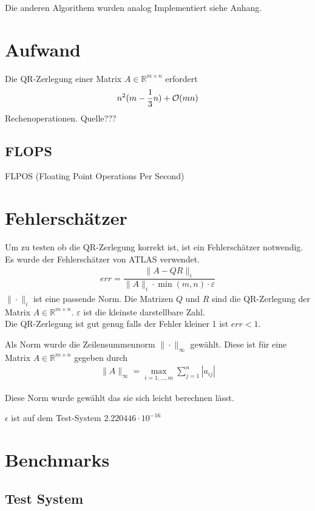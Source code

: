 Die anderen Algorithem wurden analog Implementiert siehe Anhang.


\section{Aufwand}

Die QR-Zerlegung einer Matrix $A \in \mathbb{R}^{m \times n}$  erfordert
\begin{align*}
	n^2(m-\frac{1}{3} n) + {\cal O}(mn)
\end{align*}
Rechenoperationen. Quelle???

\subsection{FLOPS}
FLPOS (Floating Point Operations Per Second) 

\section{Fehlerschätzer}

Um zu testen ob die QR-Zerlegung korrekt ist, ist ein Fehlerschätzer notwendig.
Es wurde der Fehlerschätzer von ATLAS\cite{atlas} verwendet.
\begin{align}
	err = \dfrac{\|A - QR\|_i}{\|A\|_i \cdot \min(m,n) \cdot \varepsilon}
\end{align}
$\|\cdot\|_i$ ist eine passende Norm.
Die Matrizen $Q$ und $R$ sind die QR-Zerlegung der Matrix $A \in \mathbb{R}^{m \times n}$.
$\varepsilon$ ist die kleinste darstellbare Zahl.\\
Die QR-Zerlegung ist gut genug falls der Fehler kleiner 1 ist $ err < 1 $.

Als Norm wurde die Zeilensummennorm $\|\cdot\|_\infty$ gewählt.
Diese ist für eine Matrix $A \in \mathbb{R}^{m\times n}$ gegeben durch
\begin{align*}
	\|A\|_\infty = \max_{i=1,...,m} \sum_{j=1}^{n} |a_{ij}|
\end{align*}

Diese Norm wurde gewählt das sie sich leicht berechnen lässt.

$\epsilon$ ist auf dem Test-System $2.220446\cdot10^{-16}$


\section{Benchmarks}

\subsection{Test System}

